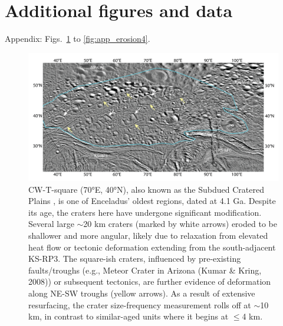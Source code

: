 \documentclass[preprint,12pt,3p,times,authoryear]{elsarticle}
\begin{document}
{%
\appendix
\section{Additional figures and data}
\setcounter{figure}{0}
Appendix: Figs.~\ref{fig:app_erosion1} to \ref{fig:app_erosion4}.


\begin{figure}[H]
    \includegraphics[width=1.0\linewidth]{fig/FigS4B_CW-T-square.png}
    \caption{CW-T-square (70°E, 40°N), also known as the Subdued Cratered Plains \citep{CrowWillard2015}, is one of Enceladus' oldest regions, dated at 4.1 Ga. Despite its age, the craters here have undergone significant modification. Several large $\sim$20 km craters (marked by white arrows) eroded to be shallower and more angular, likely due to relaxation from elevated heat flow \citep{Bland2012} or tectonic deformation extending from the south-adjacent KS-RP3. The square-ish craters, influenced by pre-existing faults/troughs (e.g., Meteor Crater in Arizona (Kumar \& Kring, 2008)) or subsequent tectonics, are further evidence of deformation along NE-SW troughs (yellow arrows). As a result of extensive resurfacing, the crater size-frequency measurement rolls off at $\sim$10 km, in contrast to similar-aged units where it begins at $\le$4 km.}
    \label{fig:app_erosion1}
\end{figure}


}
\end{document}
